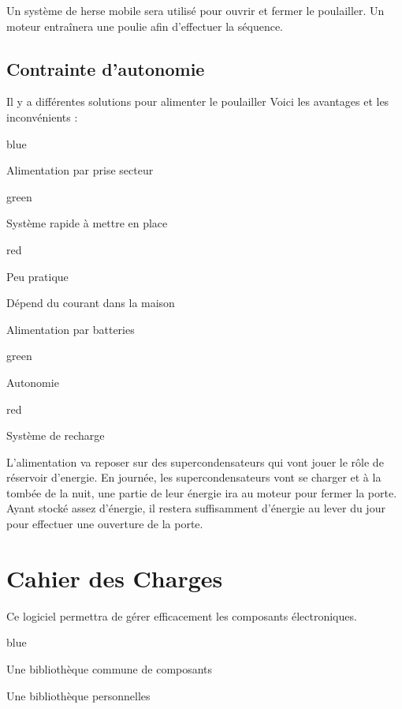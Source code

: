 {Un système de herse mobile sera utilisé pour ouvrir et fermer le poulailler.
Un moteur entraînera une poulie afin d'effectuer la séquence.

\section{Contrainte d'autonomie}


Il y a différentes solutions pour alimenter le poulailler
Voici les avantages et les inconvénients :


\begin{items}{blue}{\Triangle}
    \item Alimentation par prise secteur
    \begin{items}{green}{\Bullet}
        \item Système rapide à mettre en place
    \end{items}
    \begin{items}{red}{\Bullet}
        \item Peu pratique
        \item Dépend du courant dans la maison
    \end{items}
    \item Alimentation par batteries
    \begin{items}{green}{\Bullet}
        \item Autonomie
    \end{items}
    \begin{items}{red}{\Bullet}
        \item Système de recharge 
    \end{items}
\end{items}

L'alimentation va reposer sur des supercondensateurs qui vont jouer le rôle de réservoir d'energie.
En journée, les supercondensateurs vont se charger et à la tombée de la nuit, une partie de leur énergie ira au moteur pour fermer la porte.
Ayant stocké assez d’énergie, il restera suffisamment d’énergie au lever du jour pour effectuer une ouverture de la porte.\chapter{Cahier des Charges}
\newcommand{\constrain}[1]{\lbl{blue}{CON}{#1}}

Ce logiciel permettra de gérer efficacement les composants électroniques.

\begin{items}{blue}{\Triangle}
    \item Une bibliothèque commune de composants
    \item Une bibliothèque personnelles
\end{items}


}
